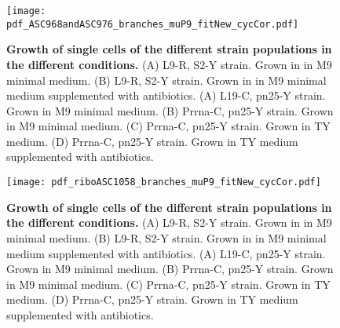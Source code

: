     


\begin{figure}
    \centering
    \texttt{[image: pdf\_ASC968andASC976\_branches\_muP9\_fitNew\_cycCor.pdf]}
    \caption{ 
        \textbf{Growth of single cells of the different strain populations in the different conditions.}
        (A) L9-R, S2-Y strain. Grown in in M9 minimal medium.
        (B) L9-R, S2-Y strain. Grown in in M9 minimal medium supplemented with antibiotics. 
        (A) L19-C, pn25-Y strain. Grown in M9 minimal medium.
        (B) Prrna-C, pn25-Y strain. Grown in M9 minimal medium.
        (C) Prrna-C, pn25-Y strain. Grown in TY medium.
        (D) Prrna-C, pn25-Y strain. Grown in TY medium supplemented with antibiotics.
    }
    \label{fig:ribo:CCsPmuY}
\end{figure}



\begin{figure}
    \centering
    \texttt{[image: pdf\_riboASC1058\_branches\_muP9\_fitNew\_cycCor.pdf]}
    \caption{ 
        \textbf{Growth of single cells of the different strain populations in the different conditions.}
        (A) L9-R, S2-Y strain. Grown in in M9 minimal medium.
        (B) L9-R, S2-Y strain. Grown in in M9 minimal medium supplemented with antibiotics. 
        (A) L19-C, pn25-Y strain. Grown in M9 minimal medium.
        (B) Prrna-C, pn25-Y strain. Grown in M9 minimal medium.
        (C) Prrna-C, pn25-Y strain. Grown in TY medium.
        (D) Prrna-C, pn25-Y strain. Grown in TY medium supplemented with antibiotics.
    }
    \label{fig:ribo:CCsPmuY}
\end{figure}





